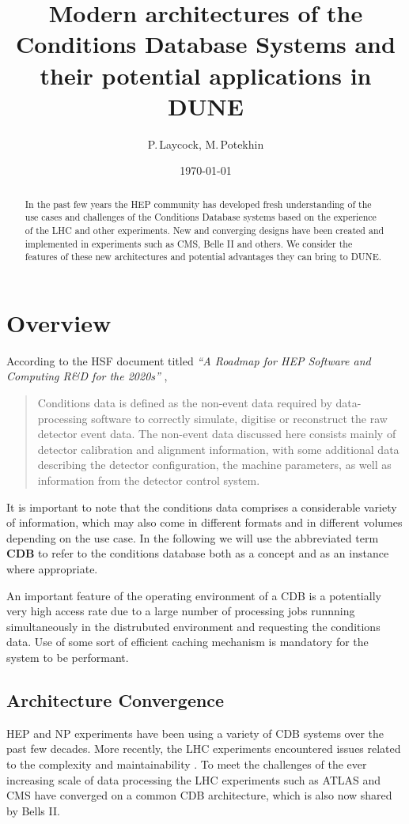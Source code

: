 \documentclass[pdftex,12pt,letter]{article}
\title{Modern architectures of the Conditions Database Systems and their potential applications in DUNE}
\date{\today}
\author{P.\,Laycock, M.\,Potekhin}
\begin{document}
\maketitle

\begin{abstract}
\noindent  In the past few years the HEP community has developed fresh understanding of
the use cases and challenges of the Conditions Database systems based on the experience of
the LHC and other experiments. New and converging designs have been created and implemented
in experiments such as CMS, Belle II and others. We consider the features of these
new architectures and potential advantages they can bring to DUNE.

\end{abstract}


\section{Overview}
According to  the HSF document titled \textit{``A Roadmap for HEP Software and Computing R\&D for the 2020s''} \cite{hsf_roadmap},
\begin{quote}
Conditions data is defined as the non-event data required by data-processing software to correctly simulate,
digitise or reconstruct the raw detector event data. The non-event data discussed here consists mainly of
detector calibration and alignment information, with some additional data describing the detector configuration,
the machine parameters, as well as information from the detector control system.
\end{quote}
\noindent It is important to note that the conditions data comprises a considerable variety of information,
which may also come in different formats and in different volumes depending on the use case. In the following
we will use the abbreviated term \textbf{CDB } to refer to the conditions database both as a concept and as an
instance where appropriate.

An important feature of the operating environment of a CDB is a potentially very high
access rate due to a large number of processing jobs runnning simultaneously in the distrubuted environment
and requesting the conditions data. Use of some sort of efficient caching mechanism is mandatory for
the system to be performant.


\subsection{Architecture Convergence}
HEP and NP experiments have been using a variety of CDB systems over the past few decades.
More recently, the LHC experiments encountered issues related to the complexity and
maintainability \cite{func_test}. To meet the challenges of the ever increasing scale of
data processing the LHC experiments such as ATLAS and CMS have converged on
a common CDB architecture, which is also now shared by Bells II.
\end{document}
